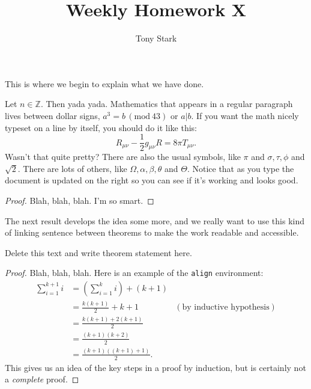 \documentclass[12pt]{article}
\newcommand{\Z}{\mathbb{Z}}
\renewcommand{\mod}[1]{\,(\text{mod}\ #1)}
\newenvironment{theorem}[2][Theorem]{\begin{trivlist}
\item[\hskip \labelsep {\bfseries #1}\hskip \labelsep {\bfseries #2.}]}{\end{trivlist}}
\begin{document}

\title{Weekly Homework X}%
\author{Tony Stark} %

\maketitle

This is where we begin to explain what we have done. 

\begin{theorem}{x.yz}
Let $n\in \Z$.  Then yada yada. Mathematics that appears in a regular paragraph lives between dollar signs, $a^3=b \mod{43}$ or $a \vert b$. If you want the math nicely typeset on a line by itself, you should do it like this:
\[
  R_{\mu\nu} - \frac{1}{2} g_{\mu\nu} R = 8\pi T_{\mu\nu}. 
\]
Wasn't that quite pretty? There are also the usual symbols, like $\pi$ and $\sigma, \tau, \phi$ and $\sqrt{2}$. There are lots of others, like $\Omega, \alpha, \beta, \theta$ and $\Theta$. Notice that as you type the document is updated on the  right so you can see if it's working and looks good.
\end{theorem}

\begin{proof}
Blah, blah, blah.  I'm so smart.
\end{proof}

The next result develops the idea some more, and we really want to use this kind of linking sentence between theorems to make the work readable and accessible. 
\begin{theorem}{x.yz} %
Delete this text and write theorem statement here.
\end{theorem}

\begin{proof}
Blah, blah, blah.  Here is an example of the \texttt{align} environment:
\begin{align*}
\sum_{i=1}^{k+1}i & = \left(\sum_{i=1}^{k}i\right) +(k+1)\\ 
& = \frac{k(k+1)}{2}+k+1 & (\text{by inductive hypothesis})\\
& = \frac{k(k+1)+2(k+1)}{2}\\
& = \frac{(k+1)(k+2)}{2}\\
& = \frac{(k+1)((k+1)+1)}{2}.
\end{align*}
This gives us an idea of the key steps in a proof by induction, but is certainly not a \emph{complete} proof.
\end{proof}
\end{document}
